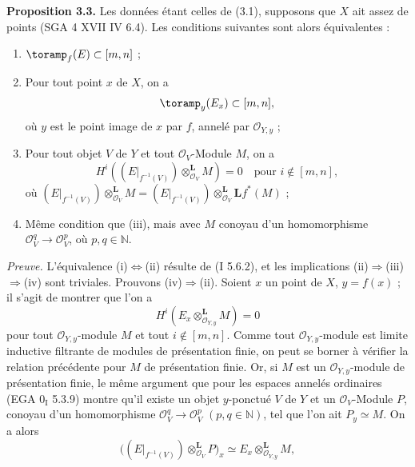 \textbf{Proposition 3.3.} Les données étant celles de (3.1), supposons que \(X\) ait assez de points (SGA 4 XVII IV 6.4). Les conditions suivantes sont alors équivalentes :
\begin{enumerate}[label=(\roman*)]
\item \(\toramp_f(E)\subset[m,n]\) ;
\item Pour tout point \(x\) de \(X\), on a
\[
  \toramp_y(E_x)\subset[m,n],
\]
où \(y\) est le point image de \(x\) par \(f\), annelé par \(\mathcal O_{Y,y}\) ;
\item Pour tout objet \(V\) de \(Y\) et tout \(\mathcal O_V\)-Module \(M\), on a
\[
  H^i\left((E\vert_{f^{-1}(V)})\otimes_{\mathcal O_V}^{\mathbf L}M\right)=0
  \quad\text{pour }i\notin[m,n],
\]
où \((E\vert_{f^{-1}(V)})\otimes_{\mathcal O_V}^{\mathbf L}M=(E\vert_{f^{-1}(V)})\otimes_{\mathcal O_V}^{\mathbf L}\mathbf Lf^*(M)\) ;
\item Même condition que (iii), mais avec \(M\) conoyau d'un homomorphisme \(\mathcal O_V^q\longrightarrow\mathcal O_V^p\), où \(p,q\in\mathbb N\).
\end{enumerate}

\emph{Preuve.} L'équivalence (i)\(\Longleftrightarrow\)(ii) résulte de (I 5.6.2), et les implications (ii)\(\Longrightarrow\)(iii)\(\Longrightarrow\)(iv) sont triviales. Prouvons (iv)\(\Longrightarrow\)(ii). Soient \(x\) un point de \(X\), \(y=f(x)\) ; il s'agit de montrer que l'on a
\begin{equation}\tag{$*$}
  H^i(E_x\otimes_{\mathcal O_{Y,y}}^{\mathbf L}M)=0
\end{equation}
pour tout \(\mathcal O_{Y,y}\)-module \(M\) et tout \(i\notin[m,n]\). Comme tout \(\mathcal O_{Y,y}\)-module est limite inductive filtrante de modules de présentation finie, on peut se borner à vérifier la relation précédente pour \(M\) de présentation finie. Or, si \(M\) est un \(\mathcal O_{Y,y}\)-module de présentation finie, le même argument que pour les espaces annelés ordinaires (EGA \(0_{\mathrm I}\) 5.3.9) montre qu'il existe un objet \(y\)-ponctué \(V\) de \(Y\) et un \(\mathcal O_V\)-Module \(P\), conoyau d'un homomorphisme \(\mathcal O_V^q\longrightarrow\mathcal O_V^p\) \((p,q\in\mathbb N)\), tel que l'on ait \(P_y\simeq M\). On a alors
\[
  \bigl((E\vert_{f^{-1}(V)})\otimes_{\mathcal O_V}^{\mathbf L}P\bigr)_x
  \simeq
  E_x\otimes_{\mathcal O_{Y,y}}^{\mathbf L}M,
\]
